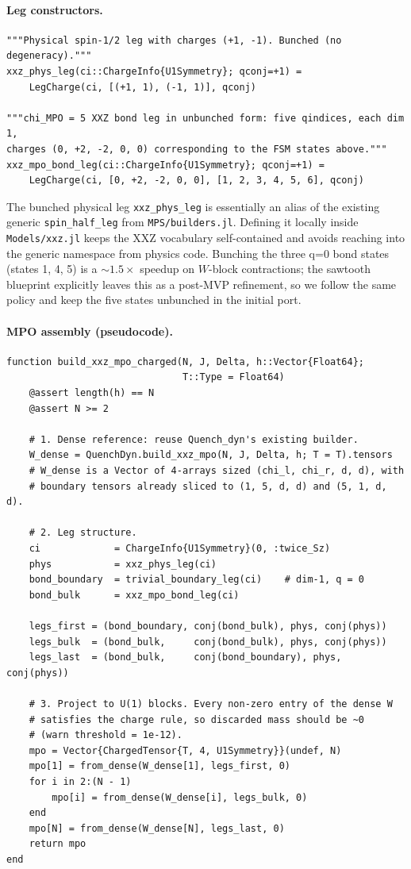 \documentclass[11pt]{article}
\begin{document}
\paragraph{Leg constructors.}
\begin{lstlisting}
"""Physical spin-1/2 leg with charges (+1, -1). Bunched (no degeneracy)."""
xxz_phys_leg(ci::ChargeInfo{U1Symmetry}; qconj=+1) =
    LegCharge(ci, [(+1, 1), (-1, 1)], qconj)

"""chi_MPO = 5 XXZ bond leg in unbunched form: five qindices, each dim 1,
charges (0, +2, -2, 0, 0) corresponding to the FSM states above."""
xxz_mpo_bond_leg(ci::ChargeInfo{U1Symmetry}; qconj=+1) =
    LegCharge(ci, [0, +2, -2, 0, 0], [1, 2, 3, 4, 5, 6], qconj)
\end{lstlisting}
The bunched physical leg \texttt{xxz\_phys\_leg} is essentially an alias of
the existing generic \texttt{spin\_half\_leg} from \texttt{MPS/builders.jl}.
Defining it locally inside \texttt{Models/xxz.jl} keeps the XXZ vocabulary
self-contained and avoids reaching into the generic namespace from physics
code.  Bunching the three q=0 bond states (states 1, 4, 5) is a $\sim 1.5\times$
speedup on $W$-block contractions; the sawtooth blueprint explicitly leaves
this as a post-MVP refinement, so we follow the same policy and keep the
five states unbunched in the initial port.

\paragraph{MPO assembly (pseudocode).}
\begin{lstlisting}
function build_xxz_mpo_charged(N, J, Delta, h::Vector{Float64};
                               T::Type = Float64)
    @assert length(h) == N
    @assert N >= 2

    # 1. Dense reference: reuse Quench_dyn's existing builder.
    W_dense = QuenchDyn.build_xxz_mpo(N, J, Delta, h; T = T).tensors
    # W_dense is a Vector of 4-arrays sized (chi_l, chi_r, d, d), with
    # boundary tensors already sliced to (1, 5, d, d) and (5, 1, d, d).

    # 2. Leg structure.
    ci             = ChargeInfo{U1Symmetry}(0, :twice_Sz)
    phys           = xxz_phys_leg(ci)
    bond_boundary  = trivial_boundary_leg(ci)    # dim-1, q = 0
    bond_bulk      = xxz_mpo_bond_leg(ci)

    legs_first = (bond_boundary, conj(bond_bulk), phys, conj(phys))
    legs_bulk  = (bond_bulk,     conj(bond_bulk), phys, conj(phys))
    legs_last  = (bond_bulk,     conj(bond_boundary), phys, conj(phys))

    # 3. Project to U(1) blocks. Every non-zero entry of the dense W
    # satisfies the charge rule, so discarded mass should be ~0
    # (warn threshold = 1e-12).
    mpo = Vector{ChargedTensor{T, 4, U1Symmetry}}(undef, N)
    mpo[1] = from_dense(W_dense[1], legs_first, 0)
    for i in 2:(N - 1)
        mpo[i] = from_dense(W_dense[i], legs_bulk, 0)
    end
    mpo[N] = from_dense(W_dense[N], legs_last, 0)
    return mpo
end
\end{lstlisting}
\end{document}
